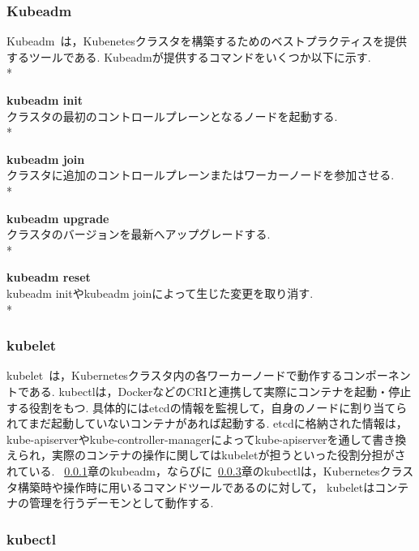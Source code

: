 \subsubsection{Kubeadm}
\label{background:container-orchestration-system:kubernetes:kubeadm}

Kubeadm~\cite{Kubeadm}は，Kubenetesクラスタを構築するためのベストプラクティスを提供するツールである.
Kubeadmが提供するコマンドをいくつか以下に示す.\\*

{\bf kubeadm init}\\
クラスタの最初のコントロールプレーンとなるノードを起動する.\\*

{\bf kubeadm join}\\
クラスタに追加のコントロールプレーンまたはワーカーノードを参加させる.\\*

{\bf kubeadm upgrade}\\
クラスタのバージョンを最新へアップグレードする.\\*

{\bf kubeadm reset}\\
kubeadm initやkubeadm joinによって生じた変更を取り消す.\\*

\subsubsection{kubelet}
\label{background:container-orchestration-system:kubernetes:kubelet}

kubelet~\cite{kubelet}は，Kubernetesクラスタ内の各ワーカーノードで動作するコンポーネントである.
kubectlは，DockerなどのCRIと連携して実際にコンテナを起動・停止する役割をもつ.
具体的にはetcdの情報を監視して，自身のノードに割り当てられてまだ起動していないコンテナがあれば起動する.
etcdに格納された情報は，kube-apiserverやkube-controller-managerによってkube-apiserverを通して書き換えられ，実際のコンテナの操作に関してはkubeletが担うといった役割分担がされている.
~\ref{background:container-orchestration-system:kubernetes:kubeadm}章のkubeadm，ならびに~\ref{background:container-orchestration-system:kubernetes:kubectl}章のkubectlは，Kubernetesクラスタ構築時や操作時に用いるコマンドツールであるのに対して，
kubeletはコンテナの管理を行うデーモンとして動作する.

\subsubsection{kubectl}
\label{background:container-orchestration-system:kubernetes:kubectl}

